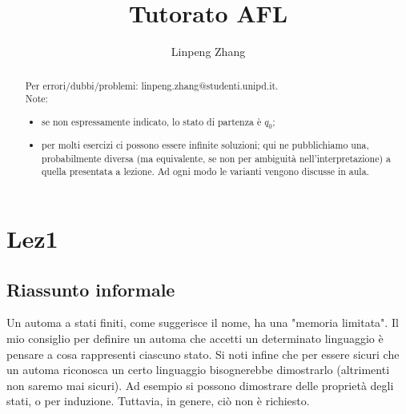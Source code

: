 \documentclass[a4paper,11pt]{article}
\begin{document}
\author{Linpeng Zhang}
\title{Tutorato AFL}
\maketitle
\begin{abstract}
    Per errori/dubbi/problemi: linpeng.zhang@studenti.unipd.it. \\Note: 
    \begin{itemize}
    \item se non espressamente indicato, lo stato di partenza è \begin{math}q_0\end{math};
    \item per molti esercizi ci possono essere infinite soluzioni; qui ne pubblichiamo una, probabilmente diversa (ma equivalente, se non per ambiguità nell'interpretazione) a quella presentata a lezione. Ad ogni modo le varianti vengono discusse in aula.
    \end{itemize}
\end{abstract}
\tableofcontents
\section{Lez1}
\subsection{Riassunto informale}
Un automa a stati finiti, come suggerisce il nome, ha una "memoria limitata". Il mio consiglio per definire un automa che accetti un determinato linguaggio è pensare a cosa rappresenti ciascuno stato. Si noti infine che per essere sicuri che un automa riconosca un certo linguaggio bisognerebbe dimostrarlo (altrimenti non saremo mai sicuri). Ad esempio si possono dimostrare delle proprietà degli stati, o per induzione. Tuttavia, in genere, ciò non è richiesto.
\end{document}
